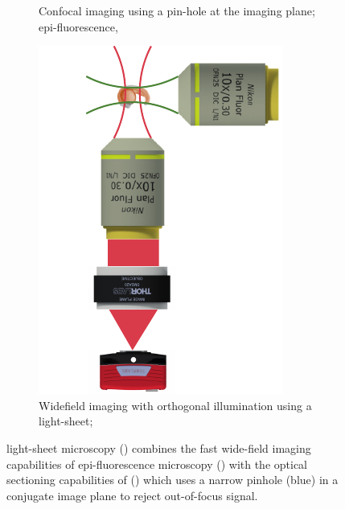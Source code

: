 \begin{figure}
\begin{subfigure}[t]{0.3\textwidth}
        \caption{Confocal imaging using a pin-hole at the imaging plane; epi-fluorescence, }
        \label{fig:epi_con_lsfm/confocal}
    \end{subfigure}
        \hfill%
    \begin{subfigure}[t]{0.3\textwidth}
        \centering
        \includegraphics{epi_con_lsfm/spim}
        \caption{Widefield imaging with orthogonal illumination using a \gls{light-sheet}; }
        \label{fig:epi_con_lsfm/spim}
    \end{subfigure}
    \hspace{0.01\textwidth}
    \caption[Comparison of \gls{wide-field}, \gls{confocal} and \gls{light-sheet} microscopy imaging modalities]
    {\Gls{light-sheet} microscopy () combines the fast \gls{wide-field} imaging capabilities of epi-fluorescence microscopy () with the optical sectioning capabilities of  () which uses a narrow pinhole (blue) in a conjugate image plane to reject out-of-focus signal.
    }
    \label{fig:epi_con_lsfm}
\end{figure}



